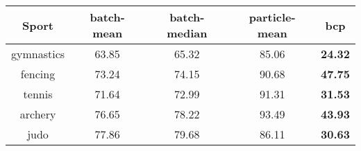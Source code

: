 \begin{tabular}{|c|c|c|c|c|}
\hline
Sport & batch-mean & batch-median & particle-mean & bcp \\
\hline
gymnastics & 63.85 & 65.32 & 85.06 & \textbf{24.32} \\
fencing & 73.24 & 74.15 & 90.68 & \textbf{47.75} \\
tennis & 71.64 & 72.99 & 91.31 & \textbf{31.53} \\
archery & 76.65 & 78.22 & 93.49 & \textbf{43.93} \\
judo & 77.86 & 79.68 & 86.11 & \textbf{30.63} \\
\hline
\end{tabular}
